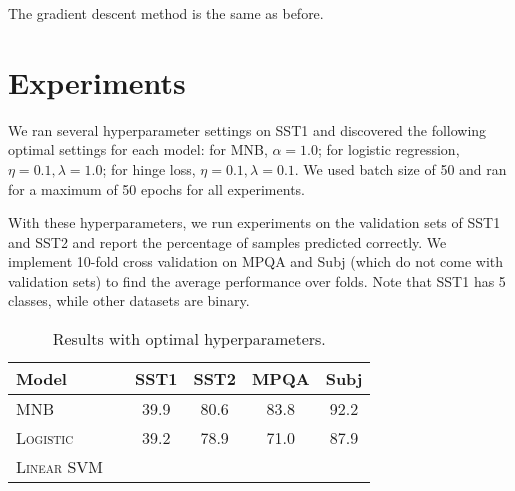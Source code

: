 \documentclass[11pt]{article}
\begin{document}
The gradient descent method is the same as before.


\begin{figure}

  \begin{algorithmic}[1]

    \EndWhile{}
    \EndProcedure{}
  \end{algorithmic}

\end{figure}


\section{Experiments}

We ran several hyperparameter settings on SST1 and discovered the following optimal settings for each model: for MNB, $\alpha = 1.0$; for logistic regression, $\eta = 0.1, \lambda = 1.0$; for hinge loss, $\eta = 0.1, \lambda = 0.1$. We used batch size of 50 and ran for a maximum of 50 epochs for all experiments.

With these hyperparameters, we run experiments on the validation sets of SST1 and SST2 and report the percentage of samples predicted correctly. We implement 10-fold cross validation on MPQA and Subj (which do not come with validation sets) to find the average performance over folds. Note that SST1 has 5 classes, while other datasets are binary.

\begin{table}[h]
\centering
\begin{tabular}{llcccc}
 \toprule
 Model &  & SST1 & SST2 & MPQA & Subj \\
 \midrule
 \textsc{MNB} & & 39.9 & 80.6 & 83.8 & 92.2 \\
 \textsc{Logistic} & & 39.2 & 78.9 & 71.0 & 87.9 \\
 \textsc{Linear SVM} & &  & &  \\
 \bottomrule
\end{tabular}
\caption{\label{tab:results} Results with optimal hyperparameters.}
\end{table}
\end{document}

